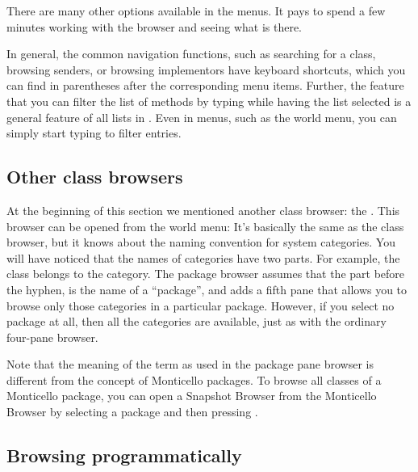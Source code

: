 \documentclass[a4paper,10pt,twoside]{book}
\begin{document}

There are many other options available in the menus.
It pays to spend a few minutes working with the browser and seeing what is there.


In general, the common navigation functions, such as searching for a class, browsing senders, or browsing implementors have keyboard shortcuts, which you can find in parentheses after the corresponding menu items.
Further, the feature that you can filter the list of methods by typing while having the list selected is a general feature of all lists in \sq.
Even in menus, such as the world menu, you can simply start typing to filter entries.

\subsection{Other class browsers}
\label{sec:otherBrowsers}

At the beginning of this section we mentioned another class browser: the .
This browser can be opened from the world menu: 
It's basically the same as the class browser, but it knows about the naming convention for system categories.
You will have noticed that the names of categories have two parts.
For example, the  class belongs to the  category.
\label{sec:package-names}
The package browser assumes that the part before the hyphen,  is the name of a ``package'', and adds a fifth pane that allows you to browse only those categories in a particular package.
However, if you select no package at all, then all the categories are available, just as with the ordinary four-pane browser.

Note that the meaning of the term  as used in the package pane browser is different from the concept of Monticello
packages.
To browse all classes of a Monticello package, you can open a Snapshot Browser from the Monticello Browser by selecting a package and then pressing .

\subsection{Browsing programmatically}
\end{document}
